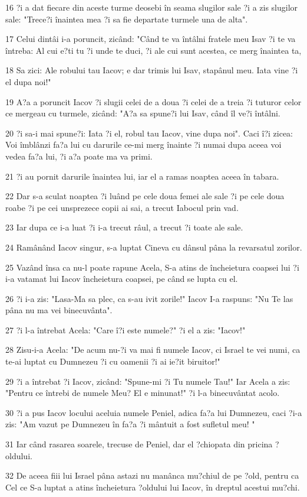 \par 16 ?i a dat fiecare din aceste turme deosebi în seama slugilor sale ?i a zis slugilor sale: "Trece?i înaintea mea ?i sa fie departate turmele una de alta".
\par 17 Celui dintâi i-a poruncit, zicând: "Când te va întâlni fratele meu Isav ?i te va întreba: Al cui e?ti tu ?i unde te duci, ?i ale cui sunt acestea, ce merg înaintea ta,
\par 18 Sa zici: Ale robului tau Iacov; e dar trimis lui Isav, stapânul meu. Iata vine ?i el dupa noi!"
\par 19 A?a a poruncit Iacov ?i slugii celei de a doua ?i celei de a treia ?i tuturor celor ce mergeau cu turmele, zicând: "A?a sa spune?i lui Isav, când îl ve?i întâlni.
\par 20 ?i sa-i mai spune?i: Iata ?i el, robul tau Iacov, vine dupa noi". Caci î?i zicea: Voi îmblânzi fa?a lui cu darurile ce-mi merg înainte ?i numai dupa aceea voi vedea fa?a lui, ?i a?a poate ma va primi.
\par 21 ?i au pornit darurile înaintea lui, iar el a ramas noaptea aceea în tabara.
\par 22 Dar s-a sculat noaptea ?i luând pe cele doua femei ale sale ?i pe cele doua roabe ?i pe cei unsprezece copii ai sai, a trecut Iabocul prin vad.
\par 23 Iar dupa ce i-a luat ?i i-a trecut râul, a trecut ?i toate ale sale.
\par 24 Ramânând Iacov singur, s-a luptat Cineva cu dânsul pâna la revarsatul zorilor.
\par 25 Vazând însa ca nu-l poate rapune Acela, S-a atins de încheietura coapsei lui ?i i-a vatamat lui Iacov încheietura coapsei, pe când se lupta cu el.
\par 26 ?i i-a zis: "Lasa-Ma sa plec, ca s-au ivit zorile!" Iacov I-a raspuns: "Nu Te las pâna nu ma vei binecuvânta".
\par 27 ?i l-a întrebat Acela: "Care î?i este numele?" ?i el a zis: "Iacov!"
\par 28 Zisu-i-a Acela: "De acum nu-?i va mai fi numele Iacov, ci Israel te vei numi, ca te-ai luptat cu Dumnezeu ?i cu oamenii ?i ai ie?it biruitor!"
\par 29 ?i a întrebat ?i Iacov, zicând: "Spune-mi ?i Tu numele Tau!" Iar Acela a zis: "Pentru ce întrebi de numele Meu? El e minunat!" ?i l-a binecuvântat acolo.
\par 30 ?i a pus Iacov locului aceluia numele Peniel, adica fa?a lui Dumnezeu, caci ?i-a zis: "Am vazut pe Dumnezeu în fa?a ?i mântuit a fost sufletul meu! "
\par 31 Iar când rasarea soarele, trecuse de Peniel, dar el ?chiopata din pricina ?oldului.
\par 32 De aceea fiii lui Israel pâna astazi nu manânca mu?chiul de pe ?old, pentru ca Cel ce S-a luptat a atins încheietura ?oldului lui Iacov, în dreptul acestui mu?chi.

